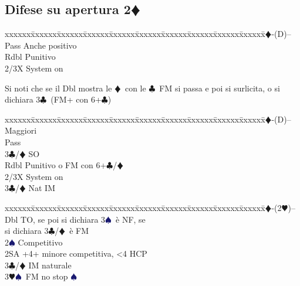 \documentclass[a4paper,italian]{article}
\newcommand{\BC}{\textcolor{OliveGreen}{$\clubsuit$}}
\newcommand{\BD}{\textcolor{RedOrange}{$\vardiamondsuit$}}
\newcommand{\BH}{\textcolor{Red2}{$\varheartsuit${}}}
\newcommand{\BS}{\textcolor{MidnightBlue}{$\spadesuit${}}}
\newcommand{\pdfd}{\texorpdfstring{\BD{}}{D}}
\newenvironment{bidtable}
{\begin{tabbing}

    xxxxxx\=xxxxxx\=xxxxxx\=xxxxxx\=xxxxxx\=xxxxxx\=xxxxxx\=xxxxxx\=xxxxxx\=xxxxxx\=\kill}
{\end{tabbing} }%
\begin{document}
                                    \subsection{Difese su apertura 2\pdfd}
                                    \begin{multicols}{2}
                                        \begin{bidtable}
                                            2\BD-(D)--\+\\
                                            Pass \> Anche positivo\\
                                            Rdbl \> Punitivo\\
                                            2/3X \> System on\-
                                        \end{bidtable}
                                        Si noti che se il Dbl mostra le \BD\ con le \BC\ FM si passa e poi si surlicita, o si dichiara 3\BC\ (FM+ con 6+\BC )
                                        \begin{bidtable}
                                            2\BD-(D)-- \>\> Maggiori\+\\
                                            Pass\+\\
                                            3\BC/\BD \> SO\-\\
                                            Rdbl \> Punitivo o FM con 6+\BC /\BD \\
                                            2/3X \> System on\\
                                            3\BC/\BD \> Nat IM\-
                                        \end{bidtable}
                                        \begin{bidtable}
                                            2\BD-(2\BH)--\+\\
                                            Dbl \> TO, se poi si dichiara 3\BS\ è NF, se\+\\\-si dichiara 3\BC/\BD\ è FM\\
                                            2\BS \> Competitivo\\
                                            2SA +4+ minore competitiva, <4 HCP\\
                                            3\BC/\BD \> IM naturale\\
                                            3\BH {}\BS\ FM no stop \BS \\

\end{bidtable}
\end{multicols}
\end{document}
